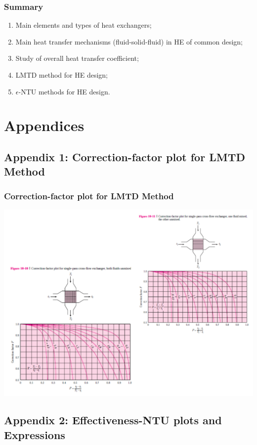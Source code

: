 \documentclass[10pt,compress]{beamer}
\begin{document}
\begin{frame}
  \frametitle{Summary}
    \begin{enumerate}
       \item Main elements and types of heat exchangers;
       \item Main heat transfer mechanisms (fluid-solid-fluid) in HE of common design;
       \item Study of overall heat transfer coefficient;
       \item LMTD method for HE design;
       \item $\epsilon$-NTU methods for HE design.
    \end{enumerate}
\end{frame}








\section{Appendices}

\subsection{Appendix 1: Correction-factor plot for LMTD Method}\label{appendix1}


{
  
}
\begin{frame}
 \frametitle{Correction-factor plot for LMTD Method}
        \begin{center}
          \includegraphics[width=.9\columnwidth,height=.65\columnwidth,clip]{./Pics/LMTD_Plot2}
        \end{center}
\end{frame}
 


\subsection{Appendix 2: Effectiveness-NTU plots and Expressions}\label{appendix2}


{
  
}
\end{document}
